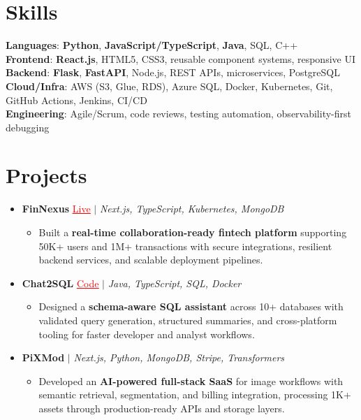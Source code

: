 \documentclass[letterpaper,10pt]{article}
\newcommand{\resumeItem}[1]{\item\small{{#1 \vspace{-2pt}}}}
\newcommand{\resumeProjectHeading}[1]{\item \small #1 \vspace{-1pt}}
\newcommand{\resumeSubHeadingListStart}{\begin{itemize}[leftmargin=0.0in, label={}]}
\newcommand{\resumeSubHeadingListEnd}{\end{itemize}}
\newcommand{\resumeProjItemListStart}{\begin{itemize}[leftmargin=0.15in,label=\textbullet,itemsep=0pt,topsep=0pt,parsep=0pt,partopsep=0pt]}
\newcommand{\resumeProjItemListEnd}{\end{itemize}\vspace{-6pt}}
\begin{document}
\section{Skills}
\begin{itemize}[leftmargin=0.15in, label={}]
\small{\item{
\textbf{Languages}: \textbf{Python}, \textbf{JavaScript/TypeScript}, \textbf{Java}, SQL, C++ \\
\textbf{Frontend}: \textbf{React.js}, HTML5, CSS3, reusable component systems, responsive UI \\
\textbf{Backend}: \textbf{Flask}, \textbf{FastAPI}, Node.js, REST APIs, microservices, PostgreSQL \\
\textbf{Cloud/Infra}: AWS (S3, Glue, RDS), Azure SQL, Docker, Kubernetes, Git, GitHub Actions, Jenkins, CI/CD \\
\textbf{Engineering}: Agile/Scrum, code reviews, testing automation, observability-first debugging
}}
\end{itemize}
\vspace{-15pt}
\section{Projects}
\resumeSubHeadingListStart
\vspace{-3pt}
\resumeProjectHeading{\textbf{FinNexus} {\href{https://fin-nexus.vercel.app/}{\textcolor{red}{\underline{Live}}}} $|$ \emph{Next.js, TypeScript, Kubernetes, MongoDB}}
\resumeProjItemListStart
\resumeItem{Built a \textbf{real-time collaboration-ready fintech platform} supporting 50K+ users and 1M+ transactions with secure integrations, resilient backend services, and scalable deployment pipelines.}
\resumeProjItemListEnd
\resumeProjectHeading{\textbf{Chat2SQL} {\href{https://github.com/SAHAJ-BHADJA/Chat2SQL}{\textcolor{red}{\underline{Code}}}} $|$ \emph{Java, TypeScript, SQL, Docker}}
\resumeProjItemListStart
\resumeItem{Designed a \textbf{schema-aware SQL assistant} across 10+ databases with validated query generation, structured summaries, and cross-platform tooling for faster developer and analyst workflows.}
\resumeProjItemListEnd
\resumeProjectHeading{\textbf{PiXMod} $|$ \emph{Next.js, Python, MongoDB, Stripe, Transformers}}
\resumeProjItemListStart
\resumeItem{Developed an \textbf{AI-powered full-stack SaaS} for image workflows with semantic retrieval, segmentation, and billing integration, processing 1K+ assets through production-ready APIs and storage layers.}
\resumeProjItemListEnd
\resumeSubHeadingListEnd
\end{document}
